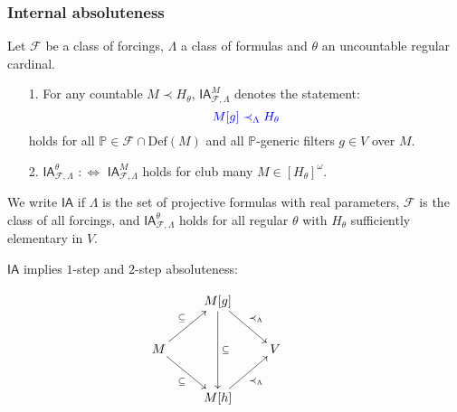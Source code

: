 \documentclass[handout, dvipsnames, usenames, 9pt, serif]{beamer}
\newcommand{\FF}{\mathcal{F}}
\newcommand{\Def}{\mathrm{Def}}
\newcommand{\IA}{\mathsf{IA}}
\newcommand{\cb}{\color{blue}}
\begin{document}
\begin{frame} 
\frametitle{Internal absoluteness} 

\begin{definition} 
Let $\FF$ be a class of forcings, $\Lambda$ a class of formulas and $\theta$ an uncountable regular cardinal. 
\begin{enumerate} 
\item[1.] 
For any countable $M\prec H_\theta$, {\color{blue}$\IA^M_{\FF,\Lambda}$} denotes the statement: \\ 
$${\color{blue} M[g] \prec_{\Lambda} H_\theta}$$ 
holds for all $\mathbb{P} \in \FF \cap \Def(M)$ and all $\mathbb{P}$-generic filters $g \in V$ over $M$. 
\item[2.] 
{\cb $\IA^\theta_{\FF,\Lambda}$} $:\Longleftrightarrow$ $\IA^M_{\FF,\Lambda}$ holds for club many $M\in[H_\theta]^\omega$. 
\end{enumerate} 
\end{definition} 
\pause  

\medskip 
We write  {\color{blue}$\IA$} if $\Lambda$ is the set of projective formulas with real parameters, $\FF$ is the class of all forcings, and $\IA^\theta_{\FF,\Lambda}$ holds for {\cb all regular $\theta$} with $H_\theta$ sufficiently elementary in $V$. 
\pause  

\medskip
{\cb $\IA$ implies} $1$-step and $2$-step absoluteness: 

\xymatrixrowsep{0.1cm}
\xymatrixcolsep{1cm}
\[ \xymatrix{ & M[g]\ar@{->}[dr]^{\prec_{\Lambda}} {}\ar@{->}[dd]^{\subseteq} & \\  
M\ar@{->}[ur]^{\subseteq}   &   & V\ar@{<-}[dl]^{\prec_{\Lambda}} & \\ 
\ & M[h]\ar@{<-}[ul]^{\subseteq} & } 
\] 

\end{frame}
\end{document}
